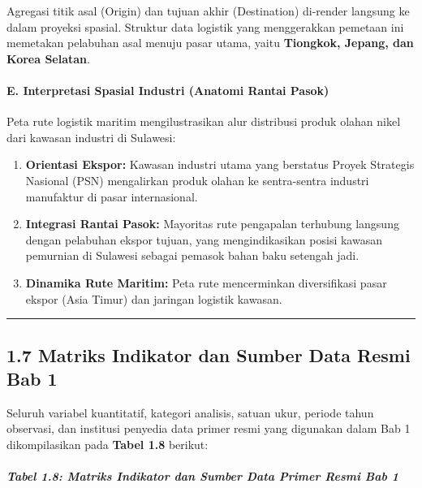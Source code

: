 \documentclass[
]{article}
\providecommand{\tightlist}{%
  \setlength{\itemsep}{0pt}\setlength{\parskip}{0pt}}
\begin{document}
Agregasi titik asal (Origin) dan tujuan akhir (Destination) di-render
langsung ke dalam proyeksi spasial. Struktur data logistik yang
menggerakkan pemetaan ini memetakan pelabuhan asal menuju pasar utama,
yaitu \textbf{Tiongkok, Jepang, dan Korea Selatan}.

\paragraph{E. Interpretasi Spasial Industri (Anatomi Rantai
Pasok)}\label{e.-interpretasi-spasial-industri-anatomi-rantai-pasok}

Peta rute logistik maritim mengilustrasikan alur distribusi produk
olahan nikel dari kawasan industri di Sulawesi:

\begin{enumerate}
\def\labelenumi{\arabic{enumi}.}
\tightlist
\item
  \textbf{Orientasi Ekspor:} Kawasan industri utama yang berstatus
  Proyek Strategis Nasional (PSN) mengalirkan produk olahan ke
  sentra-sentra industri manufaktur di pasar internasional.
\item
  \textbf{Integrasi Rantai Pasok:} Mayoritas rute pengapalan terhubung
  langsung dengan pelabuhan ekspor tujuan, yang mengindikasikan posisi
  kawasan pemurnian di Sulawesi sebagai pemasok bahan baku setengah
  jadi.
\item
  \textbf{Dinamika Rute Maritim:} Peta rute mencerminkan diversifikasi
  pasar ekspor (Asia Timur) dan jaringan logistik kawasan.
\end{enumerate}

\begin{center}\rule{0.5\linewidth}{0.5pt}\end{center}

\subsection{1.7 Matriks Indikator dan Sumber Data Resmi Bab
1}\label{matriks-indikator-dan-sumber-data-resmi-bab-1}

Seluruh variabel kuantitatif, kategori analisis, satuan ukur, periode
tahun observasi, dan institusi penyedia data primer resmi yang digunakan
dalam Bab 1 dikompilasikan pada \textbf{Tabel 1.8} berikut:

\subparagraph{Tabel 1.8: Matriks Indikator dan Sumber Data Primer Resmi
Bab
1}\label{tabel-1.8-matriks-indikator-dan-sumber-data-primer-resmi-bab-1}
\end{document}
